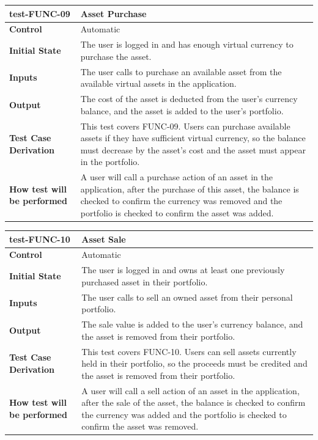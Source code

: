 \documentclass[12pt, titlepage]{article}
\begin{document}
\vspace{1em}

\noindent\begin{tabularx}{\textwidth}{>{\raggedright\arraybackslash}p{3.5cm}X}
  \toprule
  \textbf{test-FUNC-09} & \textbf{Asset Purchase}\\
  \midrule
  \textbf{Control} & Automatic\\
  \textbf{Initial State} & The user is logged in and has enough virtual currency to purchase the asset.\\
  \textbf{Inputs} & The user calls to purchase an available asset from the available virtual assets in the application.\\
  \textbf{Output} & The cost of the asset is deducted from the user's currency balance, and the asset is added to the user's portfolio.\\
  \textbf{Test Case Derivation} & This test covers FUNC-09. Users can purchase available assets if they have sufficient virtual currency, so the balance must decrease by the asset's cost and the asset must appear in the portfolio.\\
  \textbf{How test will be performed} & A user will call a purchase action of an asset in the application, after the purchase of this asset, the balance is checked to confirm the currency was removed and the portfolio is checked to confirm the asset was added.\\
  \bottomrule
\end{tabularx}

\vspace{1em}

\noindent\begin{tabularx}{\textwidth}{>{\raggedright\arraybackslash}p{3.5cm}X}
  \toprule
  \textbf{test-FUNC-10} & \textbf{Asset Sale}\\
  \midrule
  \textbf{Control} & Automatic\\
  \textbf{Initial State} & The user is logged in and owns at least one previously purchased asset in their portfolio.\\
  \textbf{Inputs} & The user calls to sell an owned asset from their personal portfolio.\\
  \textbf{Output} & The sale value is added to the user's currency balance, and the asset is removed from their portfolio.\\
  \textbf{Test Case Derivation} & This test covers FUNC-10. Users can sell assets currently held in their portfolio, so the proceeds must be credited and the asset is removed from their portfolio.\\
  \textbf{How test will be performed} &  A user will call a sell action of an asset in the application, after the sale of the asset, the balance is checked to confirm the currency was added and the portfolio is checked to confirm the asset was removed.\\
  \bottomrule
\end{tabularx}
\end{document}
